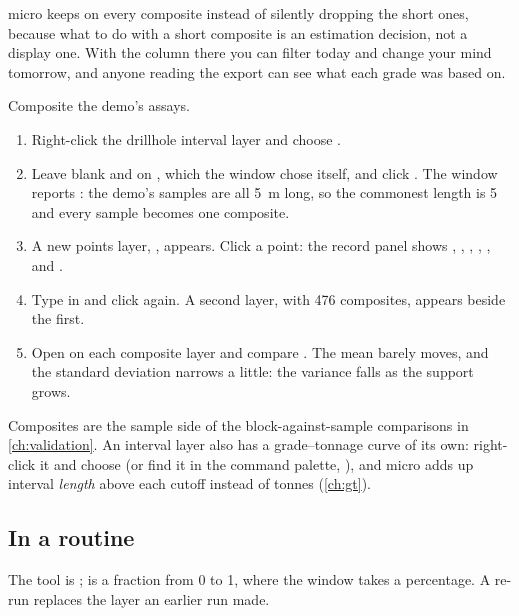 \begin{why}
micro keeps  on every composite instead of silently dropping the short ones, because what to do with a short composite is an estimation decision, not a display one. With the column there you can filter  today and change your mind tomorrow, and anyone reading the export can see what each grade was based on.
\end{why}

\begin{tryit}
Composite the demo's assays.
\begin{enumerate}
\item Right-click the drillhole interval layer and choose .
\item Leave  blank and  on , which the window chose itself, and click . The window reports : the demo's samples are all 5~m long, so the commonest length is 5 and every sample becomes one composite.
\item A new points layer, , appears. Click a point: the record panel shows , , , , ,  and .
\item Type  in  and click  again. A second layer, with 476 composites, appears beside the first.
\item Open  on each composite layer and compare . The mean barely moves, and the standard deviation narrows a little: the variance falls as the support grows.
\end{enumerate}
\end{tryit}

Composites are the sample side of the block-against-sample comparisons in \cref{ch:validation}. An interval layer also has a grade–tonnage curve of its own: right-click it and choose  (or find it in the command palette, ), and micro adds up interval \emph{length} above each cutoff instead of tonnes (\cref{ch:gt}).

\subsection{In a routine}

The tool is ;  is a fraction from 0 to 1, where the window takes a percentage. A re-run replaces the layer an earlier run made.


